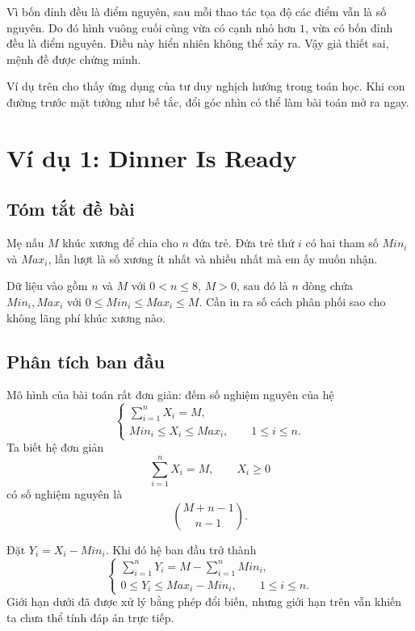 \documentclass[11pt]{article}
\begin{document}
Vì bốn đỉnh đều là điểm nguyên, sau mỗi thao tác tọa độ các điểm vẫn là số
nguyên. Do đó hình vuông cuối cùng vừa có cạnh nhỏ hơn $1$, vừa có bốn đỉnh
đều là điểm nguyên. Điều này hiển nhiên không thể xảy ra. Vậy giả thiết sai,
mệnh đề được chứng minh.

Ví dụ trên cho thấy ứng dụng của tư duy nghịch hướng trong toán học. Khi con
đường trước mặt tưởng như bế tắc, đổi góc nhìn có thể làm bài toán mở ra ngay.

\section{Ví dụ 1: Dinner Is Ready}

\subsection{Tóm tắt đề bài}

Mẹ nấu $M$ khúc xương để chia cho $n$ đứa trẻ. Đứa trẻ thứ $i$ có hai tham số
$\mathit{Min}_i$ và $\mathit{Max}_i$, lần lượt là số xương ít nhất và nhiều
nhất mà em ấy muốn nhận.

Dữ liệu vào gồm $n$ và $M$ với $0<n\le 8$, $M>0$, sau đó là $n$ dòng chứa
$\mathit{Min}_i,\mathit{Max}_i$ với
$0\le \mathit{Min}_i\le \mathit{Max}_i\le M$. Cần in ra số cách phân phối sao
cho không lãng phí khúc xương nào.

\subsection{Phân tích ban đầu}

Mô hình của bài toán rất đơn giản: đếm số nghiệm nguyên của hệ
\[
\begin{cases}
  \displaystyle\sum_{i=1}^{n} X_i=M,\\
  \mathit{Min}_i\le X_i\le \mathit{Max}_i,\qquad 1\le i\le n.
\end{cases}
\]
Ta biết hệ đơn giản
\[
  \sum_{i=1}^{n} X_i=M,\qquad X_i\ge 0
\]
có số nghiệm nguyên là
\[
  \binom{M+n-1}{n-1}.
\]

Đặt $Y_i=X_i-\mathit{Min}_i$. Khi đó hệ ban đầu trở thành
\[
\begin{cases}
  \displaystyle\sum_{i=1}^{n} Y_i
  = M-\displaystyle\sum_{i=1}^{n}\mathit{Min}_i,\\
  0\le Y_i\le \mathit{Max}_i-\mathit{Min}_i,\qquad 1\le i\le n.
\end{cases}
\]
Giới hạn dưới đã được xử lý bằng phép đổi biến, nhưng giới hạn trên vẫn khiến
ta chưa thể tính đáp án trực tiếp.
\end{document}
